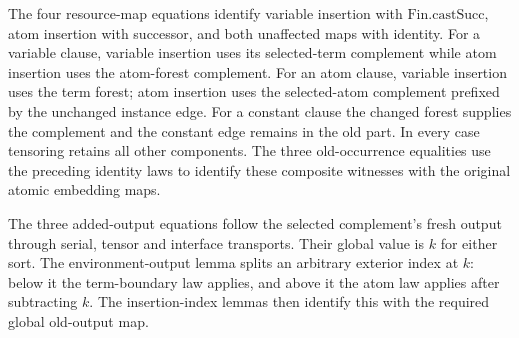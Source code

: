 


The four resource-map equations identify variable insertion with
$\mathrm{Fin.castSucc}$, atom insertion with successor, and both unaffected
maps with identity. For a variable clause, variable insertion uses its
selected-term complement while atom insertion uses the atom-forest complement.
For an atom clause, variable insertion uses the term forest; atom insertion
uses the selected-atom complement prefixed by the unchanged instance edge.
For a constant clause the changed forest supplies the complement and the
constant edge remains in the old part. In every case tensoring retains all
other components. The three old-occurrence equalities use the preceding
identity laws to identify these composite witnesses with the original
atomic embedding maps.











The three added-output equations follow the selected complement's fresh
output through serial, tensor and interface transports. Their global value is
$k$ for either sort. The environment-output lemma splits an arbitrary exterior
index at $k$: below it the term-boundary law applies, and above it the atom
law applies after subtracting $k$. The insertion-index lemmas then identify
this with the required global old-output map.

